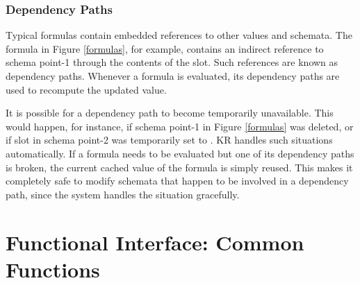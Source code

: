 \subsection{Dependency Paths}

Typical formulas contain embedded references to other values and
schemata.  The formula in Figure \ref{formulas}, for example, contains
an indirect reference to schema {\sc point-1} through the contents of
the  slot.  Such references are known as
dependency paths.
Whenever a formula is evaluated, its dependency paths are used to
recompute the updated value.

It is possible for a dependency path to become temporarily unavailable.
This would happen, for instance, if schema {\sc point-1} in Figure
\ref{formulas} was deleted, or if slot  in schema
{\sc point-2} was temporarily set to \value{nil}.  KR handles such
situations automatically.  If a formula needs to be evaluated but one
of its dependency paths is broken, the current cached value of the
formula is simply reused.  This makes it completely safe to modify
schemata that happen to be involved in a dependency path, since the
system handles the situation gracefully.


% 
% 
\chapter{Functional Interface: Common Functions}
\value{top}


